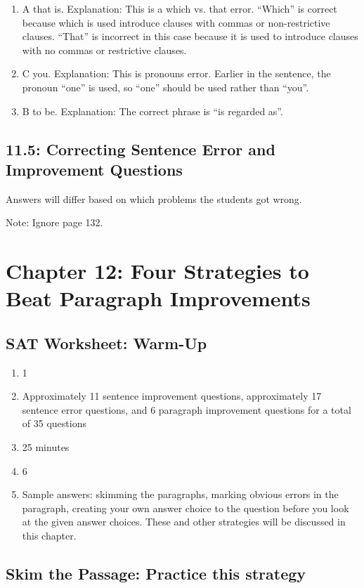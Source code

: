 \begin{enumerate}
\item A that is. Explanation: This is a which vs. that error. ``Which'' is correct because which is used introduce clauses with commas or non-restrictive clauses. ``That'' is incorrect in this case because it is used to introduce clauses with no commas or restrictive clauses.
\item C you. Explanation: This is pronouns error. Earlier in the sentence, the pronoun ``one'' is used, so ``one'' should be used rather than ``you''.
\item B to be. Explanation: The correct phrase is ``is regarded as''. 
\end{enumerate}

\subsection{11.5: Correcting Sentence Error and Improvement Questions}

Answers will differ based on which problems the students got wrong.  

Note: Ignore page 132.





\section{Chapter 12: Four Strategies to Beat Paragraph Improvements}

\subsection{SAT Worksheet: Warm-Up}

\begin{enumerate}
\item 1
\item Approximately 11 sentence improvement questions, approximately 17 sentence error questions, and 6 paragraph improvement questions for a total of 35 questions
\item 25 minutes
\item 6
\item Sample answers: skimming the paragraphs, marking obvious errors in the paragraph, creating your own answer choice to the question before you look at the given answer choices. These and other strategies will be discussed in this chapter. 
\end{enumerate}

\subsection{Skim the Passage: Practice this strategy}

